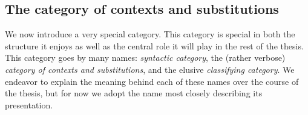 \documentclass[12pt,twoside]{reedthesis}
\theoremstyle{definition}
\theoremstyle{remark}
\theoremstyle{plain}
\newtheorem{theorem}{Theorem}
\begin{document}





\subsection{The category of contexts and substitutions}
We now introduce a very special category. This category is special in both the
structure it enjoys as well as the central role it will play in the rest of the
thesis. This category goes by many names: \emph{syntactic category}, the (rather
verbose) \emph{category of contexts and substitutions}, and the elusive
\emph{classifying category}. We endeavor to explain the meaning behind each of
these names over the course of the thesis, but for now we adopt the name most
closely describing its presentation.

\newcommand{\id}{\text{id}} %
\end{document}
